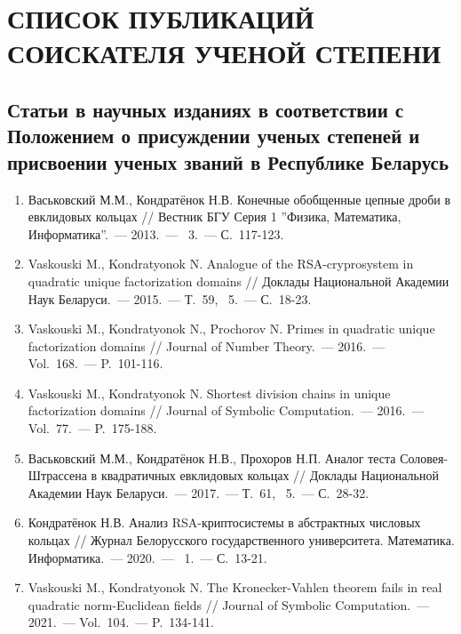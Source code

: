 \documentclass[_00_autoref.tex]{subfiles}
\begin{document}
\chapter*{\MakeUppercase{Список публикаций соискателя ученой степени}}

\renewcommand{\labelenumi}{\arabic{enumi}.}
\renewcommand{\theenumi}{\arabic{enumi}}


\vspace{-4ex}
\section*{\fontsize{14}{15}\selectfont Статьи в научных изданиях в соответствии с Положением о присуждении ученых степеней и присвоении ученых званий в Республике Беларусь}
\vspace{-4ex}

\begin{enumerate}

    \item \label{source:Vestnik_BSU_2013}
    Васьковский М.М., Кондратёнок Н.В. Конечные обобщенные цепные дроби в евклидовых кольцах // Вестник БГУ Серия 1 ''Физика, Математика, Информатика''.~--- 2013.~--- \textnumero~3.~--- С.~117-123.

    \item \label{source:NANB_2015}
    Vaskouski M., Kondratyonok N. Analogue of the RSA-cryprosystem in quadratic unique factorization domains // Доклады Национальной Академии Наук Беларуси.~--- 2015.~--- Т.~59, \textnumero~5.~--- С.~18-23.

    \item \label{source:JNT_2016}
    Vaskouski M., Kondratyonok N., Prochorov N. Primes in quadratic unique factorization domains // Journal of Number Theory.~--- 2016.~--- Vol.~168.~--- P.~101-116.

    \item \label{source:JSC_2016}
    Vaskouski M., Kondratyonok N. Shortest division chains in unique factorization domains // Journal of Symbolic Computation.~--- 2016.~--- Vol.~77.~--- P.~175-188.

    \item \label{source:NANB_2017}
    Васьковский М.М., Кондратёнок Н.В., Прохоров Н.П. Аналог теста Соловея-Штрассена в квадратичных евклидовых кольцах // Доклады Национальной Академии Наук Беларуси.~--- 2017.~--- Т.~61, \textnumero~5.~--- С.~28-32.

    \item \label{source:BSU_Journal_2020}
    Кондратёнок Н.В. Анализ RSA-криптосистемы в абстрактных числовых кольцах // Журнал Белорусского государственного университета. Математика. Информатика.~--- 2020.~--- \textnumero~1.~--- С.~13-21.

    \item \label{source:JSC_2021}
    Vaskouski M., Kondratyonok N. The Kronecker-Vahlen theorem fails in real quadratic norm-Euclidean fields // Journal of Symbolic Computation.~--- 2021.~--- Vol.~104.~--- P.~134-141.
\end{enumerate}
\end{document}

